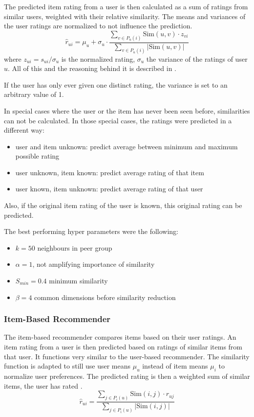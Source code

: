 \documentclass[sigconf]{acmart}
\newcommand{\abs}[1]{\left\vert #1 \right\vert}
\begin{document}
The predicted item rating from a user is then calculated as a sum of ratings from similar users, weighted with their relative similarity.
The means and variances of the user ratings are normalized to not influence the prediction.
$$\hat{r}_{ui} = \mu_u + \sigma_u \cdot \frac{\sum\limits_{v \in P_u(i)} \text{Sim}(u, v) \cdot z_{vi}}{\sum\limits_{v \in P_u(i)} \abs{\text{Sim}(u, v)}}$$
where $z_{ui} = s_{ui} / \sigma_u$ is the normalized rating, $\sigma_u$ the variance of the ratings of user $u$.
All of this and the reasoning behind it is described in \cite[Chapter~2, Section~3.1]{Aggarwal2016}.

If the user has only ever given one distinct rating, the variance is set to an arbitrary value of 1.

\hypertarget{special_cases}{}
In special cases where the user or the item has never been seen before, similarities can not be calculated. In those special cases, the ratings were predicted in a different way:
\begin{itemize}
	\item user and item unknown: predict average between minimum and maximum possible rating
	\item user unknown, item known: predict average rating of that item
	\item user known, item unknown: predict average rating of that user
\end{itemize}
Also, if the original item rating of the user is known, this original rating can be predicted.

The best performing hyper parameters were the following:
\begin{itemize}
	\item $k = 50$ neighbours in peer group
	\item $\alpha = 1$, not amplifying importance of similarity
	\item $S_{min} = 0.4$ minimum similarity
	\item $\beta = 4$ common dimensions before similarity reduction
\end{itemize}


\subsubsection{Item-Based Recommender}
\label{sec:methods:neighbourhood:item}
The item-based recommender compares items based on their user ratings. An item rating from a user is then predicted based on ratings of similar items from that user.
It functions very similar to the user-based recommender. The similarity function is adapted to still use user means $\mu_u$ instead of item means $\mu_i$ to normalize user preferences.
The predicted rating is then a weighted sum of similar items, the user has rated \cite[Chapter~2, Section~3.2]{Aggarwal2016}.
$$\hat{r}_{ui} = \frac{\sum\limits_{j \in P_i(u)} \text{Sim}(i, j) \cdot r_{uj}}{\sum\limits_{j \in P_i(u)} \abs{\text{Sim}(i, j)}}$$
\end{document}
